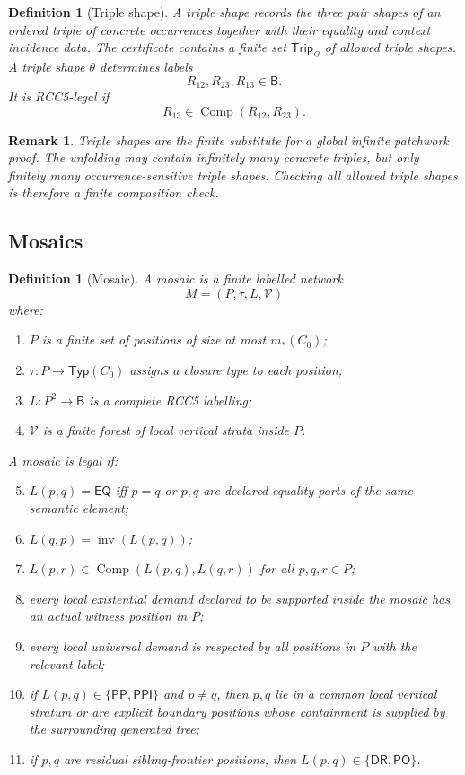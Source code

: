 \documentclass[11pt]{article}
\newtheorem{definition}[theorem]{Definition}
\newtheorem{remark}[theorem]{Remark}
\newcommand{\Base}{\mathsf B}
\newcommand{\EQ}{\mathsf{EQ}}
\newcommand{\DR}{\mathsf{DR}}
\newcommand{\PO}{\mathsf{PO}}
\newcommand{\PP}{\mathsf{PP}}
\newcommand{\PPI}{\mathsf{PPI}}
\newcommand{\Inv}{\operatorname{inv}}
\newcommand{\comp}{\operatorname{Comp}}
\newcommand{\Q}{\mathcal Q}
\newcommand{\Trip}{\mathsf{Trip}}
\newcommand{\Typ}{\mathsf{Typ}}
\begin{document}
\begin{definition}[Triple shape]\label{def:triple-shape}
A triple shape records the three pair shapes of an ordered triple of concrete occurrences together with their equality and context incidence data.  The certificate contains a finite set $\Trip_\Q$ of allowed triple shapes.  A triple shape $\theta$ determines labels
\[
  R_{12},R_{23},R_{13}\in\Base.
\]
It is RCC5-legal if
\[
  R_{13}\in\comp(R_{12},R_{23}).
\]
\end{definition}

\begin{remark}
Triple shapes are the finite substitute for a global infinite patchwork proof.  The unfolding may contain infinitely many concrete triples, but only finitely many occurrence-sensitive triple shapes.  Checking all allowed triple shapes is therefore a finite composition check.
\end{remark}

\subsection{Mosaics}

\begin{definition}[Mosaic]\label{def:mosaic}
A mosaic is a finite labelled network
\[
   M=(P,\tau,L,\mathcal V)
\]
where:
\begin{enumerate}[label=(M\arabic*)]
\item $P$ is a finite set of positions of size at most $m_*(C_0)$;
\item $\tau:P\to\Typ(C_0)$ assigns a closure type to each position;
\item $L:P^2\to\Base$ is a complete RCC5 labelling;
\item $\mathcal V$ is a finite forest of local vertical strata inside $P$.
\end{enumerate}
A mosaic is legal if:
\begin{enumerate}[label=(M\arabic*)]
\setcounter{enumi}{4}
\item $L(p,q)=\EQ$ iff $p=q$ or $p,q$ are declared equality ports of the same semantic element;
\item $L(q,p)=\Inv(L(p,q))$;
\item $L(p,r)\in\comp(L(p,q),L(q,r))$ for all $p,q,r\in P$;
\item every local existential demand declared to be supported inside the mosaic has an actual witness position in $P$;
\item every local universal demand is respected by all positions in $P$ with the relevant label;
\item if $L(p,q)\in\{\PP,\PPI\}$ and $p\ne q$, then $p,q$ lie in a common local vertical stratum or are explicit boundary positions whose containment is supplied by the surrounding generated tree;
\item if $p,q$ are residual sibling-frontier positions, then $L(p,q)\in\{\DR,\PO\}$.
\end{enumerate}
\end{definition}
\end{document}
